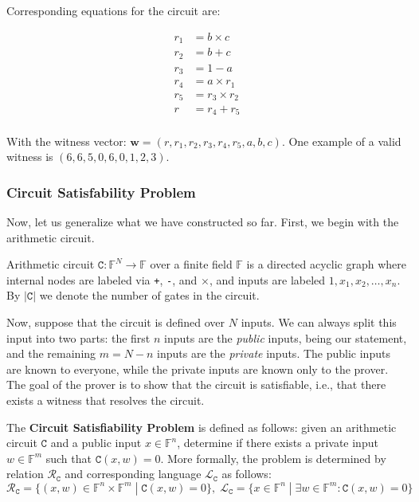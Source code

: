 \documentclass[../lecture-notes.tex]{subfiles}
\begin{document}
Corresponding equations for the circuit are:

\begin{equation*}
    \begin{aligned}
        r_1 &= b \times c \\
        r_2 &= b + c \\
        r_3 &= 1 - a \\
        r_4 &= a \times r_1 \\
        r_5 &= r_3 \times r_2 \\
        r &= r_4 + r_5 \\
    \end{aligned}
\end{equation*}

With the witness vector: $\mathbf{w} = (r, r_1, r_2, r_3, r_4, r_5, a , b, c)$. One example of a valid witness is $(6, 6, 5, 0, 6, 0, 1, 2, 3)$.

\subsubsection{Circuit Satisfability Problem}

Now, let us generalize what we have constructed so far. First, we begin with the arithmetic circuit.

\begin{definition}
    Arithmetic circuit $\mathtt{C}: \mathbb{F}^N \to \mathbb{F}$ over a finite field $\mathbb{F}$ is a directed acyclic graph where internal nodes are labeled via \texttt{+}, \texttt{-}, and $\times$, and inputs are labeled $1,x_1,x_2,\dots,x_n$. By $|\mathtt{C}|$ we denote the number of gates in the circuit.
\end{definition}

Now, suppose that the circuit is defined over $N$ inputs. We can always split this input into two parts: the first $n$ inputs are the \textit{public} inputs, being our statement, and the remaining $m = N - n$ inputs are the \textit{private} inputs. The public inputs are known to everyone, while the private inputs are known only to the prover. The goal of the prover is to show that the circuit is satisfiable, i.e., that there exists a witness that resolves the circuit.

\begin{definition}
    The \textbf{Circuit Satisfiability Problem} is defined as follows: given an arithmetic circuit $\mathtt{C}$ and a public input $x \in \mathbb{F}^n$, determine if there exists a private input $w \in \mathbb{F}^m$ such that $\mathtt{C}(x,w) = 0$. More formally, the problem is determined by relation $\mathcal{R}_{\texttt{C}}$ and corresponding language $\mathcal{L}_{\texttt{C}}$ as follows:
    \begin{equation*}
        \mathcal{R}_{\texttt{C}} = \{(x,w) \in \mathbb{F}^n \times \mathbb{F}^m \; | \; \mathtt{C}(x,w) = 0\}, \; \mathcal{L}_{\texttt{C}} = \{x \in \mathbb{F}^n \; | \; \exists w \in \mathbb{F}^m: \mathtt{C}(x,w) = 0\}
    \end{equation*}
\end{definition}
\end{document}
